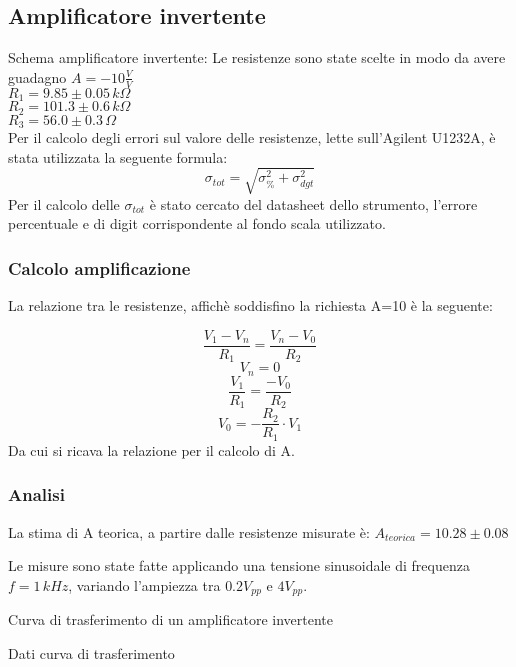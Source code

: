\subsection{Amplificatore invertente}
Schema amplificatore invertente:
Le resistenze sono state scelte in modo da avere guadagno $A=-10 \frac{V}{V}$\\
$R_1=9.85 \pm 0.05\,k\Omega $\\ %
$R_2=101.3 \pm 0.6\,k\Omega$\\ %
$R_3=56.0 \pm 0.3\,\Omega$\\ %

Per il calcolo degli errori sul valore delle resistenze, lette sull'Agilent U1232A, è stata utilizzata la seguente formula:
$$\sigma_{tot}=\sqrt{ \sigma^{2} _{\%} + \sigma^{2} _{dgt}}$$
Per il calcolo delle $\sigma_{tot}$ è stato cercato del datasheet dello strumento, l'errore percentuale e di digit
corrispondente al fondo scala utilizzato.

\subsubsection{Calcolo amplificazione}
La relazione tra le resistenze, affichè soddisfino la richiesta A=10 è la seguente:

$$\frac{V_1-V_n}{R_1}=\frac{V_n-V_0}{R_2}$$
$$V_n=0$$
$$\frac{V_1}{R_1}=\frac{-V_0}{R_2}$$
$$V_0=-\frac{R_2}{R_1} \cdot V_1$$
Da cui si ricava la relazione per il calcolo di A.

\subsubsection{Analisi}
La stima di A teorica, a partire dalle resistenze misurate è:
$A_{teorica}=10.28 \pm 0.08$ %

Le misure sono state fatte applicando una tensione sinusoidale di frequenza $ f=1 \,kHz$, variando l'ampiezza tra 
$0.2 V_{pp}$ e $4 V_{pp}$.

\begin{grafico}
 \centering
 \resizebox{\textwidth}{!}{%
 
 }%
 \caption{Curva di trasferimento di un amplificatore invertente} 
 \label{gr:amp_inv.tex} 
\end{grafico}

\begin{tabella}
 \centering
  
 \caption{Dati curva di trasferimento}
 \label{tab:tab_inv.tex}
\end{tabella}

